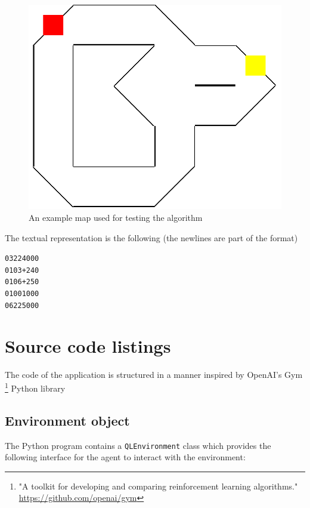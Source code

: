 \documentclass[12pt]{article}
\begin{document}
\begin{figure}[H]

  \includegraphics[width=\linewidth]{map}
  \caption{An example map used for testing the algorithm}
\end{figure}

The textual representation is the following (the newlines are part of the format)
\begin{center}
  \texttt{03224000\\0103+240\\0106+250\\01001000\\06225000}

\end{center}

\section{Source code listings}

The code of the application is structured in a manner inspired by OpenAI's Gym
\footnote{"A toolkit for developing and comparing reinforcement learning algorithms." \url{https://github.com/openai/gym}} Python library\cite{1606.01540}

\subsection{Environment object}
The Python program contains a \texttt{QLEnvironment} class which provides the following interface for
the agent to interact with the environment:
\end{document}
